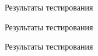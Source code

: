 \documentclass{beamer}
\begin{document}
\begin{frame}{Результаты тестирования}
\end{frame}

\begin{frame}{Результаты тестирования}
\end{frame}

\begin{frame}{Результаты тестирования}
\end{frame}
\end{document}

